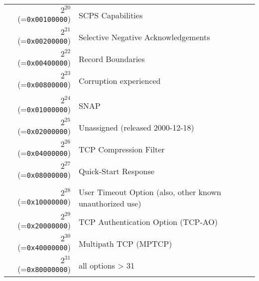 \documentclass[documentation]{subfiles}
\begin{document}
\begin{longtable}{rl}
    $2^{20}$ (={\tt 0x00100000}) & SCPS Capabilities\\
    $2^{21}$ (={\tt 0x00200000}) & Selective Negative Acknowledgements\\
    $2^{22}$ (={\tt 0x00400000}) & Record Boundaries\\
    $2^{23}$ (={\tt 0x00800000}) & Corruption experienced\\\\
    $2^{24}$ (={\tt 0x01000000}) & SNAP\\
    $2^{25}$ (={\tt 0x02000000}) & Unassigned (released 2000-12-18)\\
    $2^{26}$ (={\tt 0x04000000}) & TCP Compression Filter\\
    $2^{27}$ (={\tt 0x08000000}) & Quick-Start Response\\\\
    $2^{28}$ (={\tt 0x10000000}) & User Timeout Option (also, other known unauthorized use)\\
    $2^{29}$ (={\tt 0x20000000}) & TCP Authentication Option (TCP-AO)\\
    $2^{30}$ (={\tt 0x40000000}) & Multipath TCP (MPTCP)\\
    $2^{31}$ (={\tt 0x80000000}) & all options > 31\\
    \bottomrule
\end{longtable}
\end{document}

